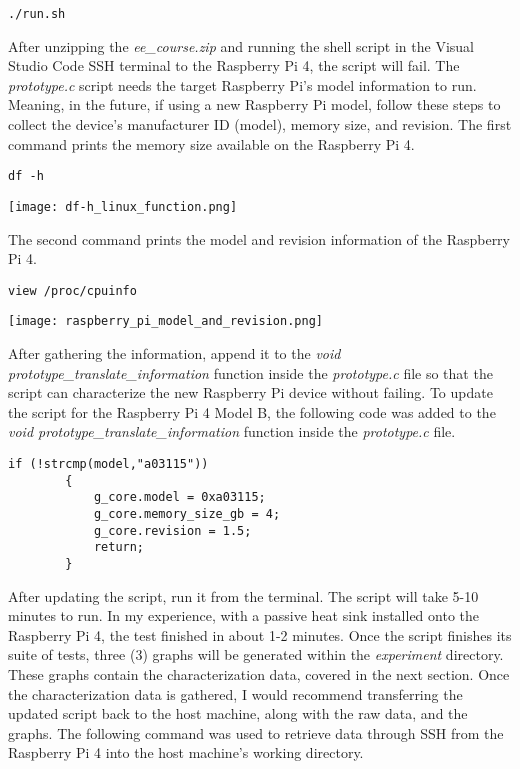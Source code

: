 \documentclass[journal]{IEEEtran}
\begin{document}
    \begin{lstlisting}[frame=single]
        ./run.sh
    \end{lstlisting}

    After unzipping the \emph{ee\_course.zip} and running the shell script in the Visual Studio Code SSH terminal to the Raspberry Pi 4, the script will fail.
    The \emph{prototype.c} script needs the target Raspberry Pi's model information to run. 
    Meaning, in the future, if using a new Raspberry Pi model, follow these steps to collect the device's manufacturer ID (model), memory size, and revision. 
    The first command prints the memory size available on the Raspberry Pi 4.

    \begin{lstlisting}[frame=single]
        df -h
    \end{lstlisting}

    \texttt{[image: df-h\_linux\_function.png]}

    The second command prints the model and revision information of the Raspberry Pi 4.

    \begin{lstlisting}[frame=single]
        view /proc/cpuinfo
    \end{lstlisting}

    \texttt{[image: raspberry\_pi\_model\_and\_revision.png]}

    After gathering the information, append it to the \emph{void prototype\_translate\_information} function inside the \emph{prototype.c} file so that the script can characterize the new Raspberry Pi device without failing.
    To update the script for the Raspberry Pi 4 Model B, the following code was added to the \emph{void prototype\_translate\_information} function inside the \emph{prototype.c} file. 

    \begin{lstlisting}[frame=single]
        if (!strcmp(model,"a03115"))
        {
            g_core.model = 0xa03115;
            g_core.memory_size_gb = 4;
            g_core.revision = 1.5;
            return;
        } 
    \end{lstlisting}

    After updating the script, run it from the terminal. 
    The script will take 5-10 minutes to run. In my experience, with a passive heat sink installed onto the Raspberry Pi 4, the test finished in about 1-2 minutes.
    Once the script finishes its suite of tests, three (3) graphs will be generated within the \emph{experiment} directory.
    These graphs contain the characterization data, covered in the next section.
    Once the characterization data is gathered, I would recommend transferring the updated script back to the host machine, along with the raw data, and the graphs.
    The following command was used to retrieve data through SSH from the Raspberry Pi 4 into the host machine's working directory.
\end{document}
